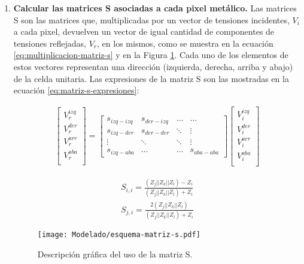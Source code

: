 \begin{enumerate}
	\item \textbf{Calcular las matrices S asociadas a cada pixel metálico.} Las matrices S son las matrices que, multiplicadas por un vector de tensiones incidentes, $V_i$ a cada pixel, devuelven un vector de igual cantidad de componentes de tensiones reflejadas, $V_r$, en los mismos, como se muestra en la ecuación \ref{eq:multiplicacion-matriz-s} y en la Figura \ref{fig:esquema-matriz-s}. Cada uno de los elementos de estos vectores representan una dirección (izquierda, derecha, arriba y abajo) de la celda unitaria. Las expresiones de la matriz S son las mostradas en la ecuación \ref{eq:matriz-s-expresiones}:
	
	\begin{align}
		\label{eq:multiplicacion-matriz-s}
		\begin{bmatrix}
			V_r^{izq} \\
			V_r^{der} \\
			V_r^{arr} \\
			V_r^{aba} \\
		\end{bmatrix}
			=
		\begin{bmatrix}
			s_{izq-izq} & s_{der-izq} & \dots & \dots \\
			s_{izq-der} & s_{der-der} & \ddots & \vdots \\
			\vdots & \ddots & \ddots     & \vdots \\
			s_{izq-aba} & \dots & \dots & s_{aba-aba}
		\end{bmatrix}
		\begin{bmatrix}
			V_i^{izq} \\
			V_i^{der} \\
			V_i^{arr} \\
			V_i^{aba} \\
		\end{bmatrix}
	\end{align}
	
	\begin{subequations}
		\label{eq:matriz-s-expresiones}
		\begin{align}
			S_{i,i} = \frac{(Z_{j}||Z_{k}||Z_{l}) -Z_{i}}{(Z_{j}||Z_{k}||Z_{l}) +Z_{i}} \\
			S_{j,i} = \frac{2 (Z_{j}||Z_{k}||Z_{l})}{(Z_{j}||Z_{k}||Z_{l}) +Z_{i}}
		\end{align}
	\end{subequations}
	
	\begin{figure}[h]
		\centering
		\texttt{[image: Modelado/esquema-matriz-s.pdf]}
		\caption{Descripción gráfica del uso de la matriz S.}
		\label{fig:esquema-matriz-s}
	\end{figure}
	

\end{enumerate}

